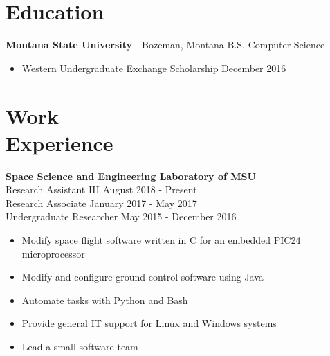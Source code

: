 \documentclass[margin]{res}
\begin{document}
 
 
 
\address{{\bf Present Address} \\ 611 S. 11th St. \\ Bozeman, MT 59715  \\ (801)-750-4528 \\ \texttt{nevinleh@gmail.com}
        }
\address{{\bf Permanent Address} \\ 3504 Macintosh Cir. \\ Cottonwood Heights, UT 84121 }

 
\begin{resume} 
\noindent\makebox[\linewidth]{\rule{\paperwidth}{0.2pt}}
\section{Education} 
\textbf{Montana State University} -  Bozeman, Montana \hfill B.S. Computer Science 
\begin{itemize} \itemsep -2pt
\item Western Undergraduate Exchange Scholarship \hfill December 2016

\end{itemize}


\noindent\makebox[\linewidth]{\rule{\paperwidth}{0.2pt}}
\section{Work \\ Experience}

{\bf  Space Science and Engineering Laboratory of MSU}  
\\Research Assistant III    \hfill August 2018 - Present
\\Research Associate    \hfill January 2017 - May 2017
\\Undergraduate Researcher             \hfill May 2015 - December 2016
\begin{itemize} \itemsep -2pt
	\item Modify space flight software written in C for an embedded PIC24 microprocessor
	\item Modify and configure ground control software using Java
	\item Automate tasks with Python and Bash
	\item Provide general IT support for Linux and Windows systems
	\item Lead a small software team
         

\end{itemize}
\end{resume}
\end{document}
